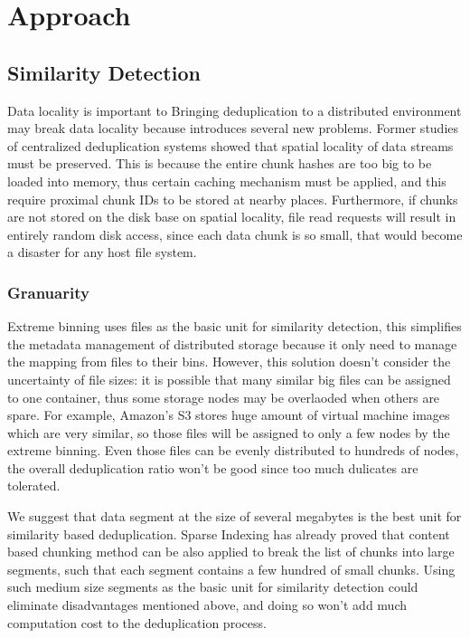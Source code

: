 \section{Approach}
\subsection{Similarity Detection}
Data locality is important to 
Bringing deduplication to a distributed environment may
break data locality because 
introduces several 
new problems. Former studies of centralized deduplication systems showed
 that spatial locality of 
data streams must be preserved. This is because the entire
 chunk hashes are too big to be loaded into memory, 
thus certain caching mechanism must be applied, and this require 
proximal chunk IDs to be stored at nearby places. 
Furthermore, if chunks are not stored on the disk
base on spatial locality, file read requests will result in entirely
 random disk access, since each data chunk is so small, that would 
become a disaster for any host file system. 

\subsubsection{Granuarity}
Extreme binning uses files as the basic unit for
similarity detection, this simplifies the metadata management of
distributed storage because it only need to manage the mapping
 from files to their bins. However, this solution doesn't
consider the uncertainty of file sizes: it is possible that many similar big files
can be assigned to one container, thus some storage nodes may be overlaoded when
others are spare. For example, Amazon's S3 stores huge amount of
virtual machine images which are very similar, so those files will be assigned
to only a few nodes by the extreme binning.
Even those files can be evenly distributed to hundreds of nodes, the overall 
deduplication ratio won't be good since too much dulicates are tolerated.

We suggest that data segment at the size of several megabytes is the best unit for
similarity based deduplication. Sparse Indexing has already 
proved that content based chunking method can be also applied to break the list of
chunks into large segments, such that each segment contains a few hundred of small chunks.
Using such medium size segments as the basic unit for similarity detection could eliminate
disadvantages mentioned above, and doing so won't add  much computation cost
to the deduplication process.

